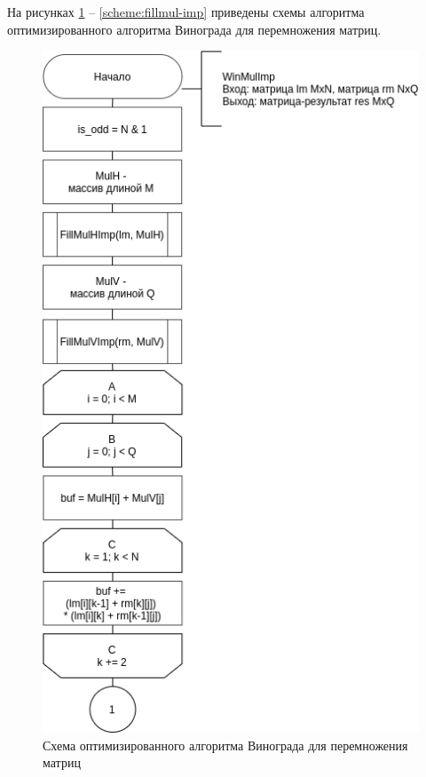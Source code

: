 На рисунках \ref{scheme:win-imp-top} -- \ref{scheme:fillmul-imp} приведены
схемы алгоритма оптимизированного алгоритма Винограда для перемножения матриц.

\begin{figure}[!htb]
	\centering
	\includegraphics[scale=0.6]{schemes/win-imp-top}
	\caption{Схема оптимизированного алгоритма Винограда для перемножения матриц}
	\label{scheme:win-imp-top}
\end{figure}


